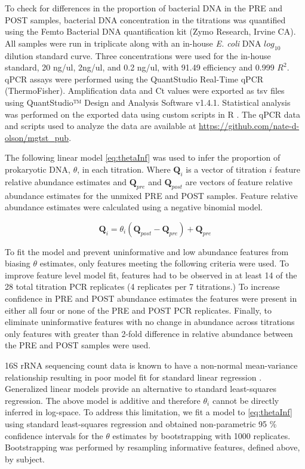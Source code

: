 \documentclass{bmcart}
\begin{document}
To check for differences in the proportion of bacterial DNA in the PRE
and POST samples, bacterial DNA concentration in the titrations was quantified
using the Femto Bacterial DNA quantification kit (Zymo Research, Irvine
CA). All samples were run in triplicate along with an in-house \emph{E.
coli} DNA \(log_{10}\) dilution standard curve. Three concentrations were used
for the in-house standard, 20 ng/ul, 2ng/ul, and 0.2 ng/ul,
with 91.49 efficiency and 0.999 \(R^2\). qPCR assays were
performed using the QuantStudio Real-Time qPCR (ThermoFisher).
Amplification data and Ct values were exported as tsv files using
QuantStudio™ Design and Analysis Software v1.4.1. Statistical analysis
was performed on the exported data using custom scripts in R \cite{R}.
The qPCR data and scripts used to analyze the data are available at
\url{https://github.com/nate-d-olson/mgtst_pub}.


The following linear model \eqref{eq:thetaInf} was used to infer the
proportion of prokaryotic DNA, \(\theta\), in each titration. Where
\(\textbf{Q}_{i}\) is a vector of titration \(i\) feature relative
abundance estimates and \(\textbf{Q}_{pre}\) and \(\textbf{Q}_{post}\)
are vectors of feature relative abundance estimates for the unmixed PRE
and POST samples. Feature relative abundance estimates were calculated
using a negative binomial model.

\begin{equation}
  \textbf{Q}_{i} = \theta_i (\textbf{Q}_{post} -\textbf{Q}_{pre}) + \textbf{Q}_{pre}
  \label{eq:thetaInf}
\end{equation}

To fit the model and prevent uninformative and low abundance features
from biasing \(\theta\) estimates, only features meeting the following
criteria were used. To improve feature level model fit, features had to be observed in at least 14 of the 28 total titration PCR replicates (4 replicates per 7 titrations.)
To increase confidence in PRE and POST abundance estimates the features were present in either all four or none of the PRE and POST PCR replicates.
Finally, to eliminate uninformative features with no change in abundance across titrations only features with greater than 2-fold difference in relative abundance between the PRE and POST samples were used.

16S rRNA sequencing count data is known to have a non-normal
mean-variance relationship resulting in poor model fit for standard
linear regression \cite{McMurdie2014}. Generalized linear models
provide an alternative to standard least-squares regression. The above
model is additive and therefore \(\theta_i\) cannot be directly inferred
in log-space. To address this limitation, we fit a model to \eqref{eq:thetaInf}
using standard least-squares regression and obtained non-parametric 95 \%
confidence intervals for the \(\theta\) estimates by bootstrapping with 1000
replicates. Bootstrapping was performed by resampling informative features, defined above, by subject.
\end{document}
